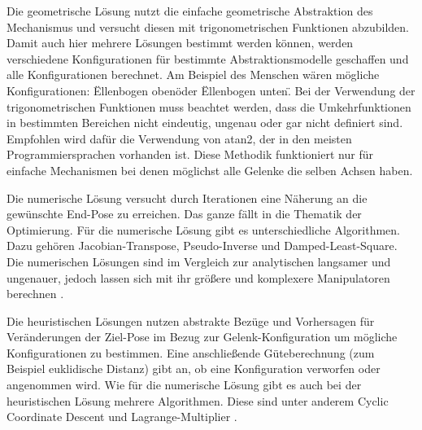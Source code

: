 Die geometrische Lösung nutzt die einfache geometrische Abstraktion des Mechanismus und versucht diesen mit trigonometrischen Funktionen abzubilden. Damit auch hier mehrere Lösungen bestimmt werden können, werden verschiedene Konfigurationen für bestimmte Abstraktionsmodelle geschaffen und alle Konfigurationen berechnet. Am Beispiel des Menschen wären mögliche Konfigurationen: \"Ellenbogen oben\" oder \"Ellenbogen unten\". Bei der Verwendung der trigonometrischen Funktionen muss beachtet werden, dass die Umkehrfunktionen in bestimmten Bereichen nicht eindeutig, ungenau oder gar nicht definiert sind. Empfohlen wird dafür die Verwendung von atan2, der in den meisten Programmiersprachen vorhanden ist. Diese Methodik funktioniert nur für einfache Mechanismen bei denen möglichst alle Gelenke die selben Achsen haben.

Die numerische Lösung versucht durch Iterationen eine Näherung an die gewünschte End-Pose zu erreichen. Das ganze fällt in die Thematik der Optimierung. Für die numerische Lösung gibt es unterschiedliche Algorithmen. Dazu gehören Jacobian-Transpose, Pseudo-Inverse und Damped-Least-Square. Die numerischen Lösungen sind im Vergleich zur analytischen langsamer und ungenauer, jedoch lassen sich mit ihr größere und komplexere Manipulatoren berechnen \citep{danielasteidl2011}.

Die heuristischen Lösungen nutzen abstrakte Bezüge und Vorhersagen für Veränderungen der Ziel-Pose im Bezug zur Gelenk-Konfiguration um mögliche Konfigurationen zu bestimmen. Eine anschließende Güteberechnung (zum Beispiel euklidische Distanz) gibt an, ob eine Konfiguration verworfen oder angenommen wird. Wie für die numerische Lösung gibt es auch bei der heuristischen Lösung mehrere Algorithmen. Diese sind unter anderem Cyclic Coordinate Descent und Lagrange-Multiplier \citep{danielasteidl2011}.

